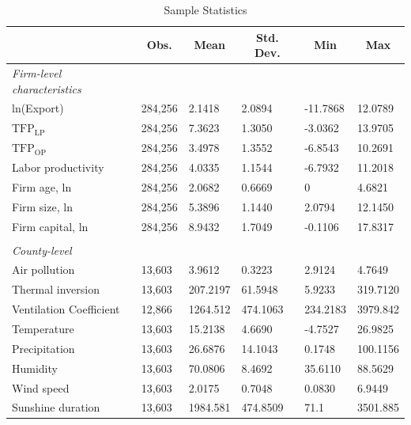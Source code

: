 \documentclass[12pt]{article}
\begin{document}
\begin{table}[H]\centering
  \caption{Sample Statistics}\label{tab:stat}
    \footnotesize
  \begin{tabular}{l*{5}{l}}
    \hline\hline
  &\multicolumn{1}{c}{Obs.}&\multicolumn{1}{c}{Mean}&\multicolumn{1}{c}{Std. Dev.}&\multicolumn{1}{c}{Min}&\multicolumn{1}{c}{Max}\\             
    \hline
    \textit{Firm-level characteristics} &&&&&\\
    ln(Export)	&284,256	&2.1418	& 2.0894&-11.7868&12.0789\\
    $\mathrm{TFP_{LP}}$	&284,256	&7.3623	&1.3050&-3.0362&13.9705\\
    $\mathrm{TFP_{OP}}$	&284,256	&3.4978	&1.3552&-6.8543&10.2691\\
    Labor productivity  &284,256	&4.0335	&1.1544&-6.7932&11.2018\\
    Firm age, ln 	&284,256	&2.0682 &0.6669&0&4.6821\\
    Firm size, ln	&284,256	&5.3896	&1.1440&2.0794&12.1450\\
    Firm capital, ln &284,256	&8.9432&1.7049&-0.1106&17.8317\\
                       &&&&&\\
    \textit{County-level} &&&&&\\    
    Air pollution      &13,603	& 3.9612	&0.3223&2.9124&4.7649\\
    Thermal inversion	 &13,603  &207.2197	&61.5948&5.9233&319.7120\\
    Ventilation Coefficient &12,866&1264.512&474.1063&234.2183&3979.842\\
    Temperature     &13,603&15.2138&4.6690&-4.7527&26.9825\\
    Precipitation   &13,603&26.6876&14.1043&0.1748&100.1156\\
    Humidity &13,603&70.0806&8.4692&35.6110&88.5629\\
    Wind speed &13,603&2.0175&0.7048&0.0830&6.9449\\
    Sunshine duration &13,603&1984.581&474.8509&71.1&3501.885\\
    \hline\hline
  \end{tabular}
\end{table}
\end{document}
